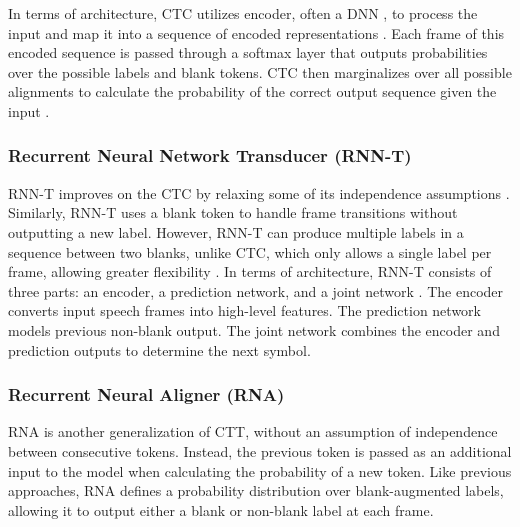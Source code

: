 \documentclass[10pt, english]{article}
\begin{document}

In terms of architecture, CTC utilizes encoder, often a DNN \citep{PrabhavalkarEnd-to-End2024}, to process the input and map it into a sequence of encoded representations \citep{GravesCTC2006}. Each frame of this encoded sequence is passed through a softmax layer that outputs probabilities over the possible labels and blank tokens. CTC then marginalizes over all possible alignments to calculate the probability of the correct output sequence given the input \citep{GravesCTC2006}.

\subsubsection{Recurrent Neural Network Transducer (RNN-T)}
RNN-T \citep{graves2012sequencetransductionrecurrentneural, graves2013deeprecurrentneuralnetworks} improves on the CTC by relaxing some of its independence assumptions \citep{PrabhavalkarEnd-to-End2024}. Similarly, RNN-T uses a blank token to handle frame transitions without outputting a new label. However, RNN-T can produce multiple labels in a sequence between two blanks, unlike CTC, which only allows a single label per frame, allowing greater flexibility \citep{graves2012sequencetransductionrecurrentneural}.
In terms of architecture, RNN-T consists of three parts: an encoder, a prediction network, and a joint network \citep{graves2012sequencetransductionrecurrentneural}. The encoder converts input speech frames into high-level features. The prediction network models previous non-blank output. The joint network combines the encoder and prediction outputs to determine the next symbol.


\subsubsection{Recurrent Neural Aligner (RNA)}
RNA \citep{sak17_interspeech} is another generalization of CTT, without an assumption of independence between consecutive tokens. Instead, the previous token is passed as an additional input to the model when calculating the probability of a new token. Like previous approaches, RNA defines a probability distribution over blank-augmented labels, allowing it to output either a blank or non-blank label at each frame. %
\end{document}
